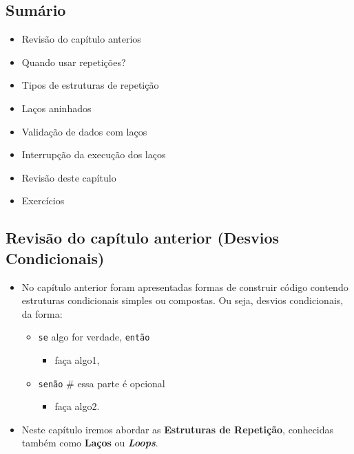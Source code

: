 \documentclass[12pt,a4paper]{article}
\providecommand{\tightlist}{%
      \setlength{\itemsep}{0pt}\setlength{\parskip}{0pt}}
\begin{document}
    \hypertarget{sumuxe1rio}{%
\subsection{Sumário}\label{sumuxe1rio}}

\begin{itemize}
\tightlist
\item
  Revisão do capítulo anterios
\item
  Quando usar repetições?
\item
  Tipos de estruturas de repetição
\item
  Laços aninhados
\item
  Validação de dados com laços
\item
  Interrupção da execução dos laços
\item
  Revisão deste capítulo
\item
  Exercícios
\end{itemize}

    \hypertarget{revisuxe3o-do-capuxedtulo-anterior-desvios-condicionais}{%
\subsection{Revisão do capítulo anterior (Desvios
Condicionais)}\label{revisuxe3o-do-capuxedtulo-anterior-desvios-condicionais}}

    \begin{itemize}
\item
  No capítulo anterior foram apresentadas formas de construir código
  contendo estruturas condicionais simples ou compostas. Ou seja,
  desvios condicionais, da forma:

  \begin{itemize}
  \tightlist
  \item
    \texttt{se} algo for verdade, \texttt{então}

    \begin{itemize}
    \tightlist
    \item
      faça algo1,
    \end{itemize}
  \item
    \texttt{senão} \# essa parte é opcional

    \begin{itemize}
    \tightlist
    \item
      faça algo2.
    \end{itemize}
  \end{itemize}
\item
  Neste capítulo iremos abordar as \textbf{Estruturas de Repetição},
  conhecidas também como \textbf{Laços} ou \textbf{\emph{Loops}}.
\end{itemize}
\end{document}
